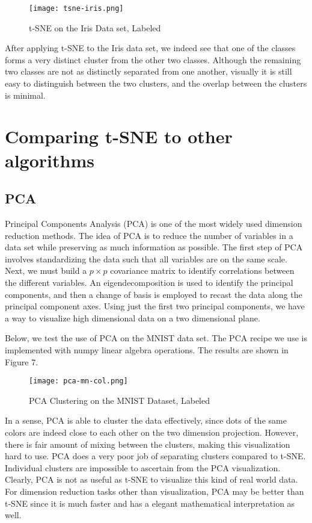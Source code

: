 \documentclass{article}
\begin{document}
\begin{figure}[H]
\caption{t-SNE on the Iris Data set, Labeled}
\centering
\texttt{[image: tsne-iris.png]}
\end{figure}

After applying t-SNE to the Iris data set, we indeed see that one of the classes forms a very distinct cluster from the other two classes. Although the remaining two classes are not as distinctly separated from one another, visually it is still easy to distinguish between the two clusters, and the overlap between the clusters is minimal.

\newpage
\section*{Comparing t-SNE to other algorithms}

\subsection*{PCA}

Principal Components Analysis (PCA) is one of the most widely used dimension reduction methods. The idea of PCA is to reduce the number of variables in a data set while preserving as much information as possible. The first step of PCA involves standardizing the data such that all variables are on the same scale. Next, we must build a $p \times p$ covariance matrix to identify correlations between the different variables. An eigendecomposition is used to identify the principal components, and then a change of basis is employed to recast the data along the principal component axes. Using just the first two principal components, we have a way to visualize high dimensional data on a two dimensional plane. 

Below, we test the use of PCA on the MNIST data set. The PCA recipe we use is implemented with numpy linear algebra operations. The results are shown in Figure 7.

\begin{figure}[H]
\caption{PCA Clustering on the MNIST Dataset, Labeled}
\centering
\texttt{[image: pca-mn-col.png]}
\end{figure}

In a sense, PCA is able to cluster the data effectively, since dots of the same colors are indeed close to each other on the two dimension projection. However, there is fair amount of mixing between the clusters, making this visualization hard to use. PCA does a very poor job of separating clusters compared to t-SNE. Individual clusters are impossible to ascertain from the PCA visualization. Clearly, PCA is not as useful as t-SNE to visualize this kind of real world data. For dimension reduction tasks other than visualization, PCA may be better than t-SNE since it is much faster and has a elegant mathematical interpretation as well. 
\end{document}
